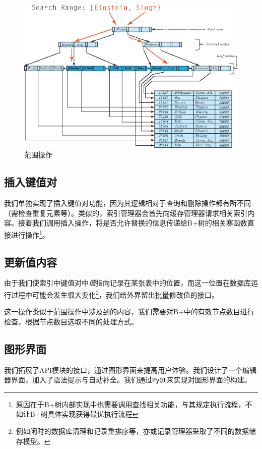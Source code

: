 \documentclass[UTF8]{ctexrep} %
\begin{document}
\begin{figure}[H]
    \centering
    \includegraphics[width=0.75\linewidth]{figure/search_delete_multi.eps}
    \caption{范围操作}
    \label{fig:search_delete_multi}
\end{figure}

\subsection{插入键值对}
我们单独实现了插入键值对功能，因为其逻辑相对于查询和删除操作都有所不同（需检查重复元素等）。类似的，索引管理器会首先向缓存管理器请求相关索引内容。接着我们调用插入操作，将是否允许替换的信息传递给B+树的相关寒函数直接进行操作\footnote{原因在于B+树内部实现中也需要调用查找相关功能，与其规定执行流程，不如让B+树具体实现获得最优执行流程}。

\subsection{更新值内容}
由于我们使索引中键值对中\textit{值}指向记录在某张表中的位置，而这一位置在数据库运行过程中可能会发生很大变化\footnote{例如闲时的数据库清理和记录重排序等，亦或记录管理器采取了不同的数据储存模型。}，我们给外界留出批量修改值的接口。
\par
这一操作类似于范围操作中涉及到的内容，我们需要对B+中的有效节点数目进行检查，根据节点数目选取不同的处理方式。

\subsection{图形界面}
我们拓展了API模块的接口，通过图形界面来提高用户体验。我们设计了一个编辑器界面，加入了语法提示与自动补全。我们通过\texttt{PyQt}来实现对图形界面的构建。
\end{document}
